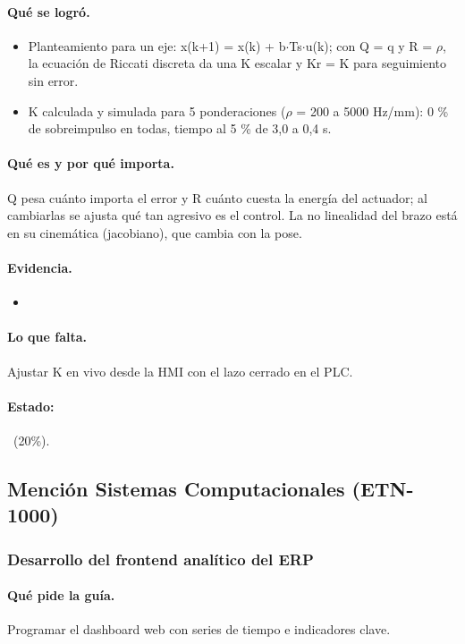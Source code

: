 \documentclass[a4paper,11pt]{article}
\begin{document}
\paragraph{Qué se logró.}
\begin{itemize}
\item Planteamiento para un eje: x(k+1) = x(k) + b$\cdot$Ts$\cdot$u(k); con Q = q y R = $\rho$, la ecuación de Riccati discreta da una K escalar y Kr = K para seguimiento sin error.
\item K calculada y simulada para 5 ponderaciones ($\rho$ = 200 a 5000 Hz/mm): 0 \% de sobreimpulso en todas, tiempo al 5 \% de 3,0 a 0,4 s.
\end{itemize}
\paragraph{Qué es y por qué importa.} Q pesa cuánto importa el error y R cuánto cuesta la energía del actuador; al cambiarlas se ajusta qué tan agresivo es el control. La no linealidad del brazo está en su cinemática (jacobiano), que cambia con la pose.
\paragraph{Evidencia.}
\begin{itemize}\small
\item {}
\end{itemize}
\paragraph{Lo que falta.} Ajustar K en vivo desde la HMI con el lazo cerrado en el PLC.
\paragraph{Estado:} \parcial~(20\%).
\subsection{Mención Sistemas Computacionales (ETN-1000)}
\subsubsection{Desarrollo del frontend analítico del ERP}
\paragraph{Qué pide la guía.} Programar el dashboard web con series de tiempo e indicadores clave.
\end{document}
